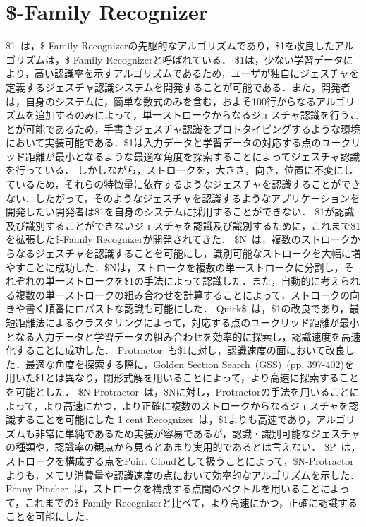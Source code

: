 \section{\$-Family Recognizer}
\$1~\cite{Wobbrock:2007:GWL:1294211.1294238}は，\$-Family Recognizerの先駆的なアルゴリズムであり，\$1を改良したアルゴリズムは，\$-Family Recognizerと呼ばれている．
\$1は，少ない学習データにより，高い認識率を示すアルゴリズムであるため，ユーザが独自にジェスチャを定義するジェスチャ認識システムを開発することが可能である．また，開発者は，自身のシステムに，簡単な数式のみを含む，およそ100行からなるアルゴリズムを追加するのみによって，単一ストロークからなるジェスチャ認識を行うことが可能であるため，手書きジェスチャ認識をプロトタイピングするような環境において実装可能である．\$1は入力データと学習データの対応する点のユークリッド距離が最小となるような最適な角度を探索することによってジェスチャ認識を行っている．
しかしながら，ストロークを，大きさ，向き，位置に不変にしているため，それらの特徴量に依存するようなジェスチャを認識することができない．したがって，そのようなジェスチャを認識するようなアプリケーションを開発したい開発者は\$1を自身のシステムに採用することができない．
\$1が認識及び識別することができないジェスチャを認識及び識別するために，これまで\$1を拡張した\$-Family Recognizerが開発されてきた．
\$N~\cite{Anthony:2010:LMR:1839214.1839258}は，複数のストロークからなるジェスチャを認識することを可能にし，識別可能なストロークを大幅に増やすことに成功した．\$Nは，ストロークを複数の単一ストロークに分割し，それぞれの単一ストロークを\$1の手法によって認識した．また，自動的に考えられる複数の単一ストロークの組み合わせを計算することによって，ストロークの向きや書く順番にロバストな認識も可能にした．
Quick\$~\cite{Reaver:2011:MQU:2021164.2021183}は，\$1の改良であり，最短距離法によるクラスタリングによって，対応する点のユークリッド距離が最小となる入力データと学習データの組み合わせを効率的に探索し，認識速度を高速化することに成功した．
Protractor~\cite{Li:2010:PFA:1753326.1753654}も\$1に対し，認識速度の面において改良した．最適な角度を探索する際に，Golden Section Search~(GSS)~\cite{Press:1992:NRC:148286}(pp. 397-402)を用いた\$1とは異なり，閉形式解を用いることによって，より高速に探索することを可能とした．
\$N-Protractor~\cite{Anthony:2012:NFA:2305276.2305296}は，\$Nに対し，Protractorの手法を用いることによって，より高速にかつ，より正確に複数のストロークからなるジェスチャを認識することを可能にした
1 cent Recognizer~\cite{Herold:2012:CRF:2331067.2331074}は，\$1よりも高速であり，アルゴリズムも非常に単純であるため実装が容易であるが，認識・識別可能なジェスチャの種類や，認識率の観点から見るとあまり実用的であるとは言えない．
\$P~\cite{Vatavu:2012:GPC:2388676.2388732}は，ストロークを構成する点をPoint Cloudとして扱うことによって，\$N-Protractorよりも，メモリ消費量や認識速度の点において効率的なアルゴリズムを示した．
Penny Pincher~\cite{Taranta:2015:PPB:2788890.2788925}は，ストロークを構成する点間のベクトルを用いることによって，これまでの\$-Family Recognizerと比べて，より高速にかつ，正確に認識することを可能にした．

